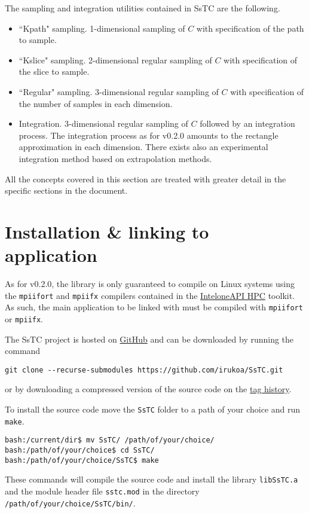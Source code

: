 \documentclass[10pt,a4paper]{article}
\begin{document}
The sampling and integration utilities contained in SsTC are the following.
\begin{itemize}
\item ``Kpath" sampling. 1-dimensional sampling of $C$ with specification of the path to sample.
\item ``Kslice" sampling. 2-dimensional regular sampling of $C$ with specification of the slice to sample.
\item ``Regular" sampling. 3-dimensional regular sampling of $C$ with specification of the number of samples in each dimension.
\item Integration. 3-dimensional regular sampling of $C$ followed by an integration process. The integration process as for v0.2.0 amounts to the rectangle approximation in each dimension. There exists also an experimental integration method based on extrapolation methods.
\end{itemize}
All the concepts covered in this section are treated with greater detail in the specific sections in the document.
\section{Installation \& linking to application}
As for v0.2.0, the library is only guaranteed to compile on Linux systems using the \verb|mpiifort| and \verb|mpiifx| compilers contained in the \href{https://www.intel.com/content/www/us/en/developer/tools/oneapi/hpc-toolkit.html}{Intel\textregistered oneAPI HPC} toolkit. As such, the main application to be linked with must be compiled with \verb|mpiifort| or \verb|mpiifx|.

The SsTC project is hosted on \href{https://github.com/irukoa/SsTC}{GitHub} and can be downloaded by running the command
\begin{verbatim}
git clone --recurse-submodules https://github.com/irukoa/SsTC.git
\end{verbatim}
or by downloading a compressed version of the source code on the \href{https://github.com/irukoa/SsTC/tags}{tag history}.

To install the source code move the \verb|SsTC| folder to a path of your choice and run \verb|make|.
\begin{verbatim}
bash:/current/dir$ mv SsTC/ /path/of/your/choice/
bash:/path/of/your/choice$ cd SsTC/
bash:/path/of/your/choice/SsTC$ make
\end{verbatim}
These commands will compile the source code and install the library \verb|libSsTC.a| and the module header file \verb|sstc.mod| in the directory \verb|/path/of/your/choice/SsTC/bin/|.
\end{document}
